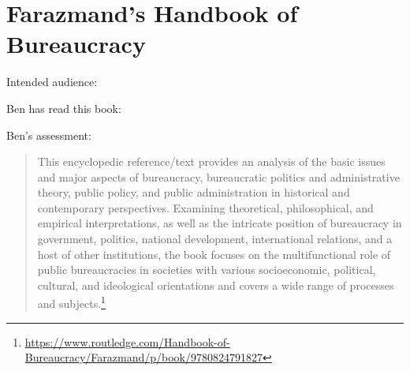 \section{Farazmand's Handbook of Bureaucracy\label{review:farazmand_handbook}}

\cite{1994_Farazmand}

Intended audience:

Ben has read this book: 

Ben's assessment: 


\begin{quote}
    This encyclopedic reference/text provides an analysis of the basic issues and major aspects of bureaucracy, bureaucratic politics and administrative theory, public policy, and public administration in historical and contemporary perspectives. Examining theoretical, philosophical, and empirical interpretations, as well as the intricate position of bureaucracy in government, politics, national development, international relations, and a host of other institutions, the book focuses on the multifunctional role of public bureaucracies in societies with various socioeconomic, political, cultural, and ideological orientations and covers a wide range of processes and subjects.\footnote{\href{https://www.routledge.com/Handbook-of-Bureaucracy/Farazmand/p/book/9780824791827}{https://www.routledge.com/Handbook-of-Bureaucracy/Farazmand/p/book/9780824791827}}
\end{quote}